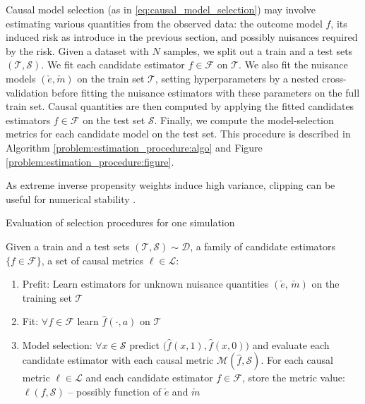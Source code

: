\documentclass[10pt]{article}
\begin{document}
\begin{multicols}{2}
    Causal model selection (as in
    \autoref{eq:causal_model_selection}) may involve estimating various quantities
    from the observed data: the outcome model $f$, its induced risk as
    introduce in the previous section, and possibly nuisances required by the
    risk.
    Given a dataset with $N$ samples, we split out a train and a test sets
    $(\mathcal{T}, \mathcal{S})$. We
    fit each candidate estimator $f \in \mathcal{F}$ on $\mathcal{T}$. We also fit
    the nuisance models $(\check e, \check m)$ on the train set
    $\mathcal{T}$, setting hyperparameters by a nested
    cross-validation before fitting the nuisance estimators with these parameters
    on the full train set. Causal quantities are then computed by applying the fitted  candidates
    estimators $f \in \mathcal{F}$ on the test set $\mathcal{S}$. Finally, we
    compute the model-selection metrics for
    each candidate model on the test set. This procedure is described in Algorithm
    \ref{problem:estimation_procedure:algo} and Figure
    \ref{problem:estimation_procedure:figure}.

    As extreme inverse propensity weights induce high variance, clipping can be
    useful for numerical stability
    \cite{swaminathan_counterfactual_2015, ionides_truncated_2008}.

    \begin{algorithm}[!htbp]
        \caption{Evaluation of selection procedures for one
            simulation}\label{problem:estimation_procedure:algo} {%
            Given a train and a test sets $(\mathcal{T}, \mathcal{S}) \sim \mathcal{D}$,
            a family of candidate estimators $\{f \in \mathcal F\}$, a set of causal
            metrics $\ell \in \mathcal L$:
            \begin{enumerate}
                \item Prefit: Learn estimators for unknown nuisance quantities $(\check e,\,\check m)$ on the training set $\mathcal{T}$
                \item Fit: $\forall f \in \mathcal{F}$ learn $\hat f(\cdot, a)$ on
                      $\mathcal T$
                \item Model selection: $\forall{x} \in \mathcal{S}$ predict $\big(\hat f(x, 1), \hat f(x, 0)\big)$ and evaluate each candidate estimator with
                      each causal metric $\mathcal M(\hat f, \mathcal{S})$. For each causal
                      metric $\ell  \in \mathcal{L}$ and each candidate estimator $f \in
                          \mathcal{F}$, store the metric value: $\ell(f, \mathcal S)$ -- possibly
                      function of $\check e$ and $\check m$
            \end{enumerate}

}
\end{algorithm}
\end{multicols}
\end{document}
